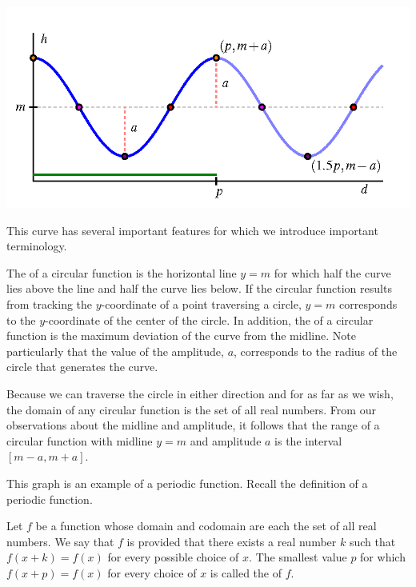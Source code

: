 \documentclass[nooutcomes, noauthor]{ximera}
\begin{document}
\begin{image}
\includegraphics{traversing-circular-properties-graph.png}
\end{image}

This curve has several important features for which we introduce important terminology.%

\begin{definition}
The   of a circular function is the horizontal line \(y = m\) for which half the curve lies above the line and half the curve lies below.  If the circular function results from tracking the \(y\)-coordinate of a point traversing a circle, \(y = m\) corresponds to the \(y\)-coordinate of the center of the circle.  In addition, the   of a circular function is the maximum deviation of the curve from the midline.  Note particularly that the value of the amplitude, \(a\), corresponds to the radius of the circle that generates the curve.%

Because we can traverse the circle in either direction and for as far as we wish, the domain of any circular function is the set of all real numbers.  From our observations about the midline and amplitude, it follows that the range of a circular function  with midline \(y = m\) and amplitude \(a\) is the interval \([m-a,m+a]\).
\end{definition}

This graph is an example of a periodic function.  Recall the definition of a periodic function.

\begin{definition}
Let \(f\) be a function whose domain and codomain are each the set of all real numbers.  We say that \(f\) is  provided that there exists a real number \(k\) such that \(f(x+k) = f(x)\) for every possible choice of \(x\).  The smallest value \(p\) for which \(f(x+p) = f(x)\) for every choice of \(x\) is called the  of \(f\).%
\end{definition}
\end{document}
